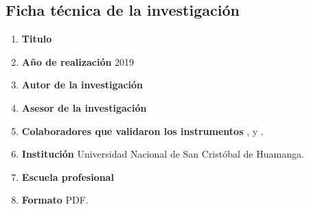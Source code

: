 \documentclass[12pt,a4paper]{article}
\begin{document}
\subsection{Ficha técnica de la investigación \label{ficha tecnica}}
\begin{enumerate}
	\item \textbf{Titulo }\titulo\textbf{ }
	\item \textbf{Año de realización }2019
	\item \textbf{Autor de la investigación }\autor
	\item \textbf{Asesor de la investigación }\asesor   
	\item \textbf{Colaboradores que validaron los instrumentos }\asesor, \expert y \expertt.
	\item \textbf{Institución }Universidad Nacional de San Cristóbal de Huamanga. 
	\item \textbf{Escuela profesional }\lugar
	\item \textbf{Formato }PDF.\textbf{ }
	

\end{enumerate}
\end{document}
